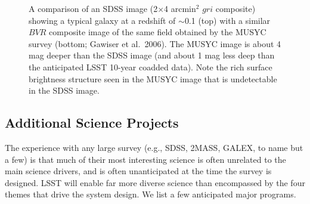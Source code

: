 \documentclass{emulateapj}
\begin{document}
\begin{figure}
\vskip -1in
\caption{
A comparison of an SDSS image (2$\times$4 arcmin$^2$ $gri$ composite) showing a typical galaxy at 
a redshift of $\sim$0.1 (top) with a similar $BVR$ composite image of the same field obtained by the MUSYC survey (bottom; 
Gawiser et al.~2006). The MUSYC image is about 4 mag deeper than the SDSS image (and about 1 mag less deep 
than the anticipated LSST 10-year coadded data). Note the rich surface brightness structure seen in the MUSYC 
image that is undetectable in the SDSS image.} 
\label{Fig:musyc}
\end{figure}


\subsection{  Additional Science Projects}

The experience with any large survey (e.g., SDSS, 2MASS, GALEX, to name but a 
few) is that much of their most interesting science is often unrelated to 
the main science drivers, and is often unanticipated at the time the survey is 
designed. LSST will enable far more diverse science than encompassed by the 
four themes that drive the system design. We list a few anticipated major 
programs.
\end{document}
